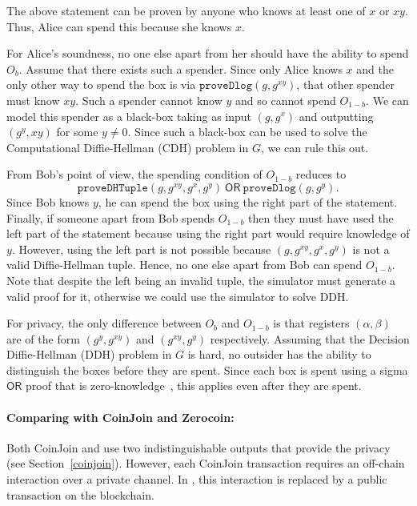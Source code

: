 \documentclass[runningheads]{llncs}
\newcommand{\zerocoin}{Zerocoin\xspace}
\newcommand{\ornode}{\ensuremath{\mathsf{OR}}}
\begin{document}
The above statement can be proven by anyone who knows at least one of $x$ or $xy$. 
Thus, Alice can spend this because she knows $x$. 

For Alice's soundness, no one else apart from her should have the ability to spend $O_b$. Assume that there exists such a spender. Since only Alice knows $x$ and the only other way to spend the box is via $\texttt{proveDlog}(g, g^{xy})$, that other spender must know $xy$. Such a spender cannot know $y$ and so cannot spend $O_{1-b}$. We can model this spender as a black-box taking as input $(g, g^x)$ and outputting $(g^y, xy)$ for some $y\neq 0$. Since such a black-box can be used to solve the Computational Diffie-Hellman (CDH) problem in $G$, we can rule this out.

From Bob's point of view, the spending condition of $O_{1-b}$ reduces to 
$$\texttt{proveDHTuple}(g, g^{xy}, g^x, g^{y}) ~\ornode~ \texttt{proveDlog}(g, g^{y}).$$
Since Bob knows $y$, he can spend the box using the right part of the statement. Finally, if someone apart from Bob spends $O_{1-b}$ then they must have used the left part of the statement because using the right part would require knowledge of $y$. However, using the left part is not possible because $(g, g^{xy}, g^x, g^{y})$ is not a valid Diffie-Hellman tuple. Hence, no one else apart from Bob can spend $O_{1-b}$. Note that despite the left being an invalid tuple, the simulator must generate a valid proof for it, otherwise we could use the simulator to solve DDH.

For privacy, the only difference between $O_b$ and $O_{1-b}$ is that registers $({\alpha},{\beta})$ are of the form $(g^y, g^{xy})$ and $(g^{xy}, g^y)$ respectively. Assuming that the Decision Diffie-Hellman (DDH) problem in $G$ is hard, no outsider has the ability to distinguish the boxes before they are spent. Since each box is spent using a sigma $\ornode$ proof that is zero-knowledge~\cite{Dam10}, this applies even after they are spent. 

\paragraph{Comparing with CoinJoin and \zerocoin:} Both CoinJoin and \algname use two indistinguishable outputs that provide the privacy (see Section~\ref{coinjoin}). However, each CoinJoin transaction requires an off-chain interaction over a private channel. In \algname, this interaction is replaced by a public transaction on the blockchain. 

\end{document}
